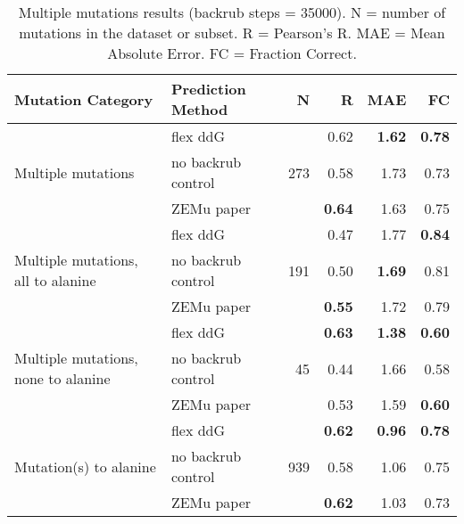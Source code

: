 \begin{table}
  \begin{tabular}{llrrrr}
\toprule
Mutation Category &   Prediction Method &    N &    R &  MAE &   FC \\
\midrule
 \multirow{ 3}{*}{Multiple mutations} & flex ddG & \multirow{ 3}{*}{273} & 0.62 & \textbf{1.62} & \textbf{0.78}  \\
 & no backrub control & & 0.58 & 1.73 & 0.73  \\
 & ZEMu paper & & \textbf{0.64} & 1.63 & 0.75  \\
\hline
 \multirow{ 3}{*}{Multiple mutations, all to alanine} & flex ddG & \multirow{ 3}{*}{191} & 0.47 & 1.77 & \textbf{0.84}  \\
 & no backrub control & & 0.50 & \textbf{1.69} & 0.81  \\
 & ZEMu paper & & \textbf{0.55} & 1.72 & 0.79  \\
\hline
 \multirow{ 3}{*}{Multiple mutations, none to alanine} & flex ddG & \multirow{ 3}{*}{45} & \textbf{0.63} & \textbf{1.38} & \textbf{0.60}  \\
 & no backrub control & & 0.44 & 1.66 & 0.58  \\
 & ZEMu paper & & 0.53 & 1.59 & \textbf{0.60}  \\
\hline
 \multirow{ 3}{*}{Mutation(s) to alanine} & flex ddG & \multirow{ 3}{*}{939} & \textbf{0.62} & \textbf{0.96} & \textbf{0.78}  \\
 & no backrub control & & 0.58 & 1.06 & 0.75  \\
 & ZEMu paper & & \textbf{0.62} & 1.03 & 0.73  \\
\bottomrule
\end{tabular}
  \caption[Multiple mutations results]{
    Multiple mutations results (backrub steps = 35000). N = number of mutations in the dataset or subset. R = Pearson's R. MAE = Mean Absolute Error. FC = Fraction Correct.
  } \label{tab:table-mult}
\end{table}
